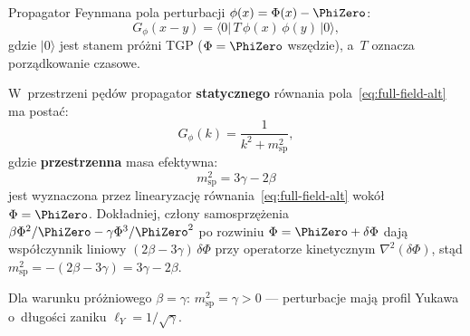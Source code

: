\begin{definition}\label{def:propagator}
Propagator Feynmana pola perturbacji $\phi(x) = \Phi(x) - \PhiZero$:
\begin{equation}\label{eq:propagator-x}
  G_\phi(x - y) = \langle 0|\,T\,\phi(x)\,\phi(y)\,|0\rangle,
\end{equation}
gdzie $|0\rangle$ jest stanem pr\'o\.zni TGP ($\Phi = \PhiZero$
wsz\k{e}dzie), a~$T$ oznacza porz\k{a}dkowanie czasowe.
\end{definition}

\begin{proposition}\label{prop:propagator-k}
W~przestrzeni p\k{e}d\'ow propagator \textbf{statycznego}
r\'ownania pola~\eqref{eq:full-field-alt} ma posta\'c:
\begin{equation}\label{eq:propagator-k}
  \boxed{
    G_\phi(k) = \frac{1}{k^2 + m_{\mathrm{sp}}^2},
  }
\end{equation}
gdzie \textbf{przestrzenna} masa efektywna:
\begin{equation}\label{eq:meff-spatial}
  m_{\mathrm{sp}}^2
  = 3\gamma - 2\beta
\end{equation}
jest wyznaczona przez linearyzacj\k{e}
r\'ownania~\eqref{eq:full-field-alt} wok\'o\l{} $\Phi = \PhiZero$.
Dok\l{}adniej, cz\l{}ony samosprz\k{e}\.zenia
$\beta\Phi^2/\PhiZero - \gamma\Phi^3/\PhiZero^2$ po rozwiniu
$\Phi = \PhiZero + \delta\Phi$ daj\k{a} wsp\'o\l{}czynnik
liniowy $(2\beta - 3\gamma)\,\delta\Phi$ przy operatorze
kinetycznym $\nabla^2(\delta\Phi)$, st\k{a}d
$m_{\mathrm{sp}}^2 = -(2\beta - 3\gamma) = 3\gamma - 2\beta$.

Dla warunku pr\'o\.zniowego $\beta = \gamma$:
$m_{\mathrm{sp}}^2 = \gamma > 0$ ---
perturbacje maj\k{a} profil Yukawa o~d\l{}ugo\'sci
zaniku $\ell_Y = 1/\sqrt{\gamma}$.
\end{proposition}

